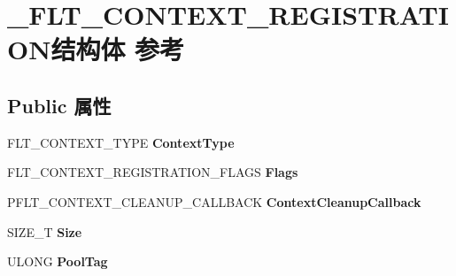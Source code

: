 \hypertarget{struct___f_l_t___c_o_n_t_e_x_t___r_e_g_i_s_t_r_a_t_i_o_n}{}\section{\+\_\+\+F\+L\+T\+\_\+\+C\+O\+N\+T\+E\+X\+T\+\_\+\+R\+E\+G\+I\+S\+T\+R\+A\+T\+I\+O\+N结构体 参考}
\label{struct___f_l_t___c_o_n_t_e_x_t___r_e_g_i_s_t_r_a_t_i_o_n}
\subsection*{Public 属性}
\begin{DoxyCompactItemize}
\item 
\mbox{\label{struct___f_l_t___c_o_n_t_e_x_t___r_e_g_i_s_t_r_a_t_i_o_n_ac5b4d3718eab4af138cfe6c4201311f4}} 
F\+L\+T\+\_\+\+C\+O\+N\+T\+E\+X\+T\+\_\+\+T\+Y\+PE {\bfseries Context\+Type}
\item 
\mbox{\label{struct___f_l_t___c_o_n_t_e_x_t___r_e_g_i_s_t_r_a_t_i_o_n_adc6e2890b44137604f38ff77ba316bed}} 
F\+L\+T\+\_\+\+C\+O\+N\+T\+E\+X\+T\+\_\+\+R\+E\+G\+I\+S\+T\+R\+A\+T\+I\+O\+N\+\_\+\+F\+L\+A\+GS {\bfseries Flags}
\item 
\mbox{\label{struct___f_l_t___c_o_n_t_e_x_t___r_e_g_i_s_t_r_a_t_i_o_n_af8107079844c4d73de8531b1a5e45608}} 
P\+F\+L\+T\+\_\+\+C\+O\+N\+T\+E\+X\+T\+\_\+\+C\+L\+E\+A\+N\+U\+P\+\_\+\+C\+A\+L\+L\+B\+A\+CK {\bfseries Context\+Cleanup\+Callback}
\item 
\mbox{\label{struct___f_l_t___c_o_n_t_e_x_t___r_e_g_i_s_t_r_a_t_i_o_n_a9c2fa297c087b02ef8485db77d185c64}} 
S\+I\+Z\+E\+\_\+T {\bfseries Size}
\item 
\mbox{\label{struct___f_l_t___c_o_n_t_e_x_t___r_e_g_i_s_t_r_a_t_i_o_n_aaeb443227735b4a4b184c969ee1fbe10}} 
U\+L\+O\+NG {\bfseries Pool\+Tag}
\item 
\mbox{\label{struct___f_l_t___c_o_n_t_e_x_t___r_e_g_i_s_t_r_a_t_i_o_n_a9f0f0a827b859c79bc38032be8679f2c}} 

\end{DoxyCompactItemize}

